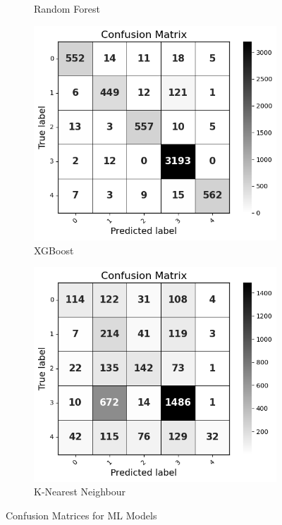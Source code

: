 \begin{figure}[H]
\begin{subfigure}[b]{0.49\textwidth}
        \caption{Random Forest}
        \label{RFCM}  %
    \end{subfigure}
    \hfill
    \vspace{0.25cm}
    \begin{subfigure}[b]{0.49\textwidth}
        \centering
        \includegraphics[width=\textwidth]{Images/XG Confusion Matrix.png}
        \caption{XGBoost}
        \label{XGCM}  %
    \end{subfigure}
    \hfill
    \begin{subfigure}[b]{0.49\textwidth}
        \centering
        \includegraphics[width=\textwidth]{Images/KNN Confusion Matrix.png}
        \caption{K-Nearest Neighbour}
        \label{KNNCM}  %
    \end{subfigure}
    \hfill

    \label{fig:comparison}
    \caption{Confusion Matrices for ML Models}
\end{figure}

